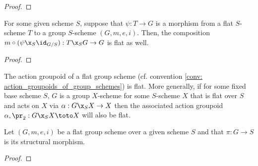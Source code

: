                 \begin{proof}
                    
                \end{proof}
            \begin{lemma} \label{lemma: flatness_criterion_for_action_groupoids_of_group_schemes}
                For some given scheme $S$, suppose that $\psi: T \to G$ is a morphism from a flat $S$-scheme $T$ to a group $S$-scheme $(G, m, e, i)$. Then, the composition $m \circ (\psi \x_S \id_{G/S}): T \x_S G \to G$ is flat as well.
            \end{lemma}
                \begin{proof}
                    
                \end{proof}
            \begin{corollary}
                The action groupoid of a flat group scheme (cf. convention \ref{conv: action_groupoids_of_group_schemes}) is flat. More generally, if for some fixed base scheme $S$, $G$ is a group $X$-scheme for some $S$-scheme $X$ that is flat over $S$ and acts on $X$ via $\alpha: G \x_S X \to X$ then the associated action groupoid $\alpha, \pr_2: G \x_S X \toto X$ will also be flat.
            \end{corollary}
            \begin{proposition} \label{prop: differential_forms_on_group_schemes}
                Let $(G, m, e, i)$ be a flat group scheme over a given scheme $S$ and that $\pi: G \to S$ is its structural morphism. 
            \end{proposition}
                \begin{proof}
                    
                \end{proof}
                
